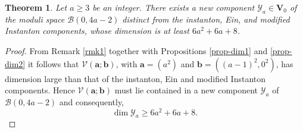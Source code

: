 \documentclass[twoside,reqno]{amsart}
\theoremstyle{plain}
\newtheorem{theorem}{Theorem}[section]
\begin{document}
%
\begin{theorem}\label{dim-family11}
Let $a\geq3$ be an integer. There exists a new component $\mathcal{Y}_a\in\mathbf{V}_0$ of the moduli space $\mathcal{B}(0,4a-2)$ distinct 
from the instanton, Ein, and modified Instanton components, whose dimension is at least $6a^2+6a+8$.
\end{theorem}
\begin{proof}
From Remark \ref{rmk1} together with Propositions \ref{prop-dim1} and \ref{prop-dim2} it follows that 
$\mathcal{V}(\boldsymbol{a};\boldsymbol{b})$, with $\boldsymbol{a}=(a^2)$ and $\boldsymbol{b}=({(a-1)}^2,0^2)$, has 
dimension large than that of the instanton, Ein and modified Instanton components. Hence 
$\mathcal{V}(\boldsymbol{a};\boldsymbol{b})$ must lie contained in a new component $\mathcal{Y}_a$ 
of $\mathcal{B}(0,4a-2)$ and consequently,
$$\dim \mathcal{Y}_a\geq 6a^2+6a+8.$$
\end{proof}
\end{document}
